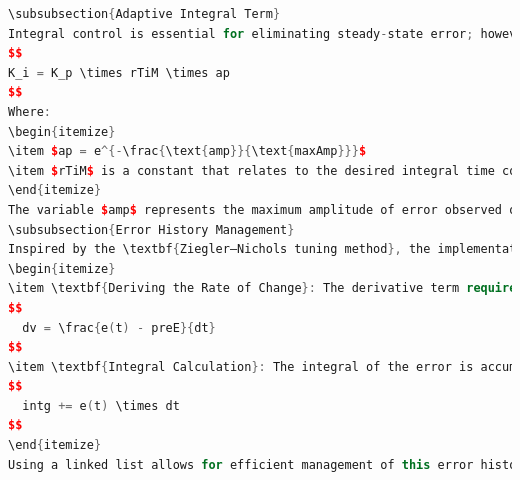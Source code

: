 \documentclass[a4paper,12pt]{article}
\begin{document}
\begin{lstlisting}[language=C++]
\subsubsection{Adaptive Integral Term}
Integral control is essential for eliminating steady-state error; however, it can lead to issues like integral windup, where the integral term accumulates excessively during periods of sustained error. To mitigate this, the integral gain $K_i$ is adaptively computed as follows:
$$
K_i = K_p \times rTiM \times ap
$$
Where:
\begin{itemize}
\item $ap = e^{-\frac{\text{amp}}{\text{maxAmp}}}$
\item $rTiM$ is a constant that relates to the desired integral time constant.
\end{itemize}
The variable $amp$ represents the maximum amplitude of error observed over a session. By using the exponential decay factor $ap$, the contribution of the integral term is diminished during periods of high error, effectively reducing the risk of windup. When the error is within an acceptable range, $ap$ approaches 1, allowing the integral term to contribute effectively to the control output.
\subsubsection{Error History Management}
Inspired by the \textbf{Ziegler–Nichols tuning method}, the implementation maintains a history of past errors and their timestamps to calculate the derivative and integral terms accurately. This history management is crucial for two main reasons:
\begin{itemize}
\item \textbf{Deriving the Rate of Change}: The derivative term requires knowledge of how fast the error is changing. By storing previous error values in a linked list, we can accurately compute the change in error over time ($\frac{de(t)}{dt}$):
$$
  dv = \frac{e(t) - preE}{dt}
$$
\item \textbf{Integral Calculation}: The integral of the error is accumulated over time, enabling the controller to respond to persistent deviations from the setpoint:
$$
  intg += e(t) \times dt
$$
\end{itemize}
Using a linked list allows for efficient management of this error history. As new errors are added, older entries can be pruned to ensure that only relevant data is retained, which helps avoid excessive memory usage and keeps the calculations focused on the most recent behavior of the system.

\end{lstlisting}
\end{document}

